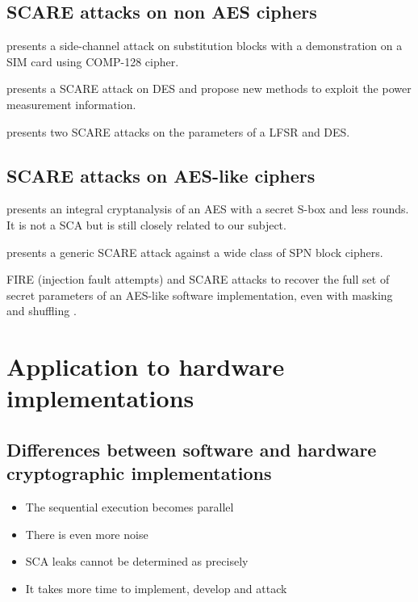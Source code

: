 \documentclass[11pt]{sdm}
\begin{document}
\subsection{SCARE attacks on non AES ciphers}

\cite{Novak_2003} presents a side-channel attack on substitution blocks with a demonstration on a SIM card using COMP-128 cipher.

\cite{Daudigny_Ledig_Muller_Valette_2005} presents a SCARE attack on DES and propose new methods to exploit the power measurement information.

\cite{Guilley_Sauvage_Micolod_Réal_Valette_2010} presents two SCARE attacks on the parameters of a LFSR and DES.

\subsection{SCARE attacks on AES-like ciphers}

\cite{Tiessen_Knudsen_Kölbl_Lauridsen_2015} presents an integral cryptanalysis of an AES with a secret S-box and less rounds. It is not a SCA but is still closely related to our subject.

\cite{Rivain_Roche_2013} presents a generic SCARE attack against a wide class of SPN block ciphers.

FIRE (injection fault attempts) and SCARE attacks to recover the full set of secret parameters of an AES-like software implementation, even with masking and shuffling \cite{Clavier_Isorez_Marion_Wurcker_2015}.

\section{Application to hardware implementations}

\subsection{Differences between software and hardware cryptographic implementations}

\begin{itemize}
    \item The sequential execution becomes parallel
    \item There is even more noise
    \item SCA leaks cannot be determined as precisely
    \item It takes more time to implement, develop and attack
\end{itemize}
\end{document}
